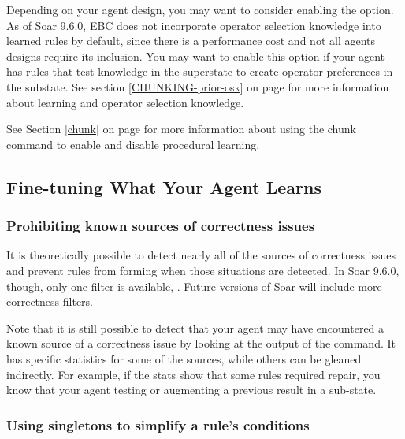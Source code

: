 Depending on your agent design, you may want to consider enabling the  option.  As of Soar 9.6.0, EBC does not incorporate operator selection knowledge into learned rules by default, since there is a performance cost and not all agents designs require its inclusion.  You may want to enable this option if your agent has rules that test knowledge in the superstate to create operator preferences in the substate.  See section \ref{CHUNKING-prior-osk} on page \pageref{CHUNKING-prior-osk} for more information about learning and operator selection knowledge. 

See Section \ref{chunk} on page \pageref{chunk} for more information about using the chunk command to enable and disable procedural learning.


\subsection{Fine-tuning What Your Agent Learns}
\label{CHUNKING-usage-tuning}

\subsubsection{Prohibiting known sources of correctness issues}
\label{CHUNKING-usage-tuning-correctness}

It is theoretically possible to detect nearly all of the sources of correctness issues and prevent rules from forming when those situations are detected.  In Soar 9.6.0, though, only one filter is available, .  Future versions of Soar will include more correctness filters.

Note that it is still possible to detect that your agent may have encountered a known source of a correctness issue by looking at the output of the  command.  It has specific statistics for some of the sources, while others can be gleaned indirectly.  For example, if the stats show that some rules required repair, you know that your agent testing or augmenting a previous result in a sub-state.

\subsubsection{Using singletons to simplify a rule's conditions}
\label{CHUNKING-usage-tuning-conditions}


